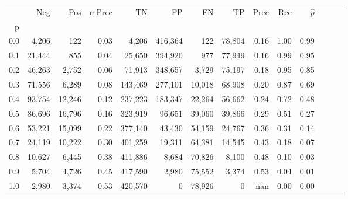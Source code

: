 \begin{tabular}{rrrrrrrrrrrrrr}
\toprule
{} &     Neg &     Pos & mPrec &       TN &       FP &      FN &      TP &  Prec &   Rec & $\hat{p}$ \\
p   &         &         &       &          &          &         &         &       &       &           \\
\midrule
0.0 &   4,206 &     122 &  0.03 &    4,206 &  416,364 &     122 &  78,804 &  0.16 &  1.00 &      0.99 \\
0.1 &  21,444 &     855 &  0.04 &   25,650 &  394,920 &     977 &  77,949 &  0.16 &  0.99 &      0.95 \\
0.2 &  46,263 &   2,752 &  0.06 &   71,913 &  348,657 &   3,729 &  75,197 &  0.18 &  0.95 &      0.85 \\
0.3 &  71,556 &   6,289 &  0.08 &  143,469 &  277,101 &  10,018 &  68,908 &  0.20 &  0.87 &      0.69 \\
0.4 &  93,754 &  12,246 &  0.12 &  237,223 &  183,347 &  22,264 &  56,662 &  0.24 &  0.72 &      0.48 \\
0.5 &  86,696 &  16,796 &  0.16 &  323,919 &   96,651 &  39,060 &  39,866 &  0.29 &  0.51 &      0.27 \\
0.6 &  53,221 &  15,099 &  0.22 &  377,140 &   43,430 &  54,159 &  24,767 &  0.36 &  0.31 &      0.14 \\
0.7 &  24,119 &  10,222 &  0.30 &  401,259 &   19,311 &  64,381 &  14,545 &  0.43 &  0.18 &      0.07 \\
0.8 &  10,627 &   6,445 &  0.38 &  411,886 &    8,684 &  70,826 &   8,100 &  0.48 &  0.10 &      0.03 \\
0.9 &   5,704 &   4,726 &  0.45 &  417,590 &    2,980 &  75,552 &   3,374 &  0.53 &  0.04 &      0.01 \\
1.0 &   2,980 &   3,374 &  0.53 &  420,570 &        0 &  78,926 &       0 &   nan &  0.00 &      0.00 \\
\bottomrule
\end{tabular}
